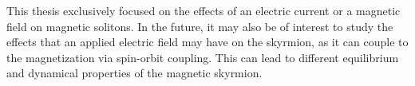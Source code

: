\documentclass[12pt, a4paper, twoside, openright]{article}		%
\numberwithin{equation}{section}
\begin{document}
This thesis exclusively focused on the effects of an electric current or a magnetic field on magnetic solitons. In the future, it may also be of interest to study the effects that an applied electric field may have on the skyrmion, as it can couple to the magnetization via spin-orbit coupling. This can lead to different equilibrium and dynamical properties of the magnetic skyrmion.



\end{document}
